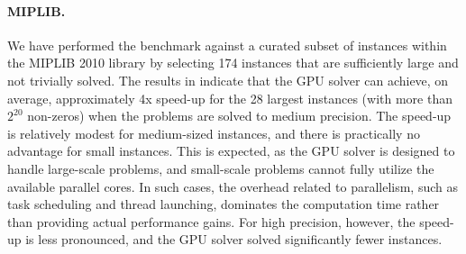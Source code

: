 \documentclass{article}
\begin{document}
\begin{table}
  \footnotesize
  
  \caption{Solution times for CPU solvers (Gurobi and Ipopt) and GPU solvers (MadIPM and MadNLP) are represented using SGM10, defined as $(\prod_{i=1}^n (t_i + 10))^{1/n} - 10$, where $t_i$ denotes the solve time for the $i$-th instance (in seconds; unsolved instances are assigned a maximum wall time of 900 seconds) across various datasets: MIPLIB (88 small, 58 medium, and 28 large \glspl*{lp}), PGLIB-OPF (31 small, 24 medium, and 11 large \glspl*{nlp}), and COPS (13 small, 16 medium, and 16 large \glspl*{nlp}). For Gurobi, the Barrier method is used, with both the Presolve and Crossover options disabled. MadNLP is configured with cuDSS, while Ipopt is configured with either Ma27 (for PGLIB-OPF) or Ma57 (for COPS). All \glspl*{nlp} are modeled using ExaModels, which supports \gls*{nlp} function evaluation on both CPU and GPU. The benchmarking was conducted on a workstation equipped with two Intel Xeon Gold 6130 CPUs, two Quadro GV~100 GPUs, and 128 GB of memory.
  }
  \label{tab:results}
\end{table}



\paragraph{MIPLIB.}
We have performed the benchmark against a curated subset of instances within the MIPLIB 2010 library by selecting 174 instances that are sufficiently large and not trivially solved. The results in  indicate that the GPU solver can achieve, on average, approximately 4x speed-up for the 28 largest instances (with more than $2^{20}$ non-zeros) when the problems are solved to medium precision. The speed-up is relatively modest for medium-sized instances, and there is practically no advantage for small instances. This is expected, as the GPU solver is designed to handle large-scale problems, and small-scale problems cannot fully utilize the available parallel cores. In such cases, the overhead related to parallelism, such as task scheduling and thread launching, dominates the computation time rather than providing actual performance gains. For high precision, however, the speed-up is less pronounced, and the GPU solver solved significantly fewer instances.
\end{document}
